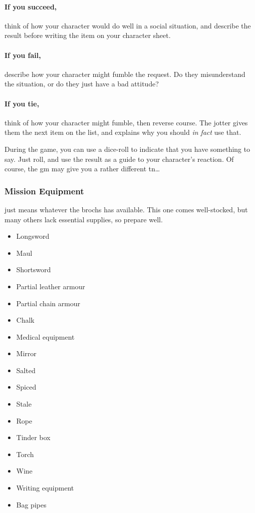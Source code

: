 \begin{multicols}{2}
\paragraph{If you succeed,}
think of how your character would do well in a social situation, and describe the result before writing the item on your character sheet.

\paragraph{If you fail,}
describe how your character might fumble the request.
Do they misunderstand the situation, or do they just have a bad attitude?

\paragraph{If you tie,}
think of how your character might fumble, then reverse course.
The jotter gives them the next item on the list, and explains why you should \emph{in fact} use that.

During the game, you can use a dice-roll to indicate that you have something to say.
Just roll, and use the result as a guide to your character's reaction.%
Of course, the \gls{gm} may give you a rather different \gls{tn}\ldots

\subsubsection{Mission Equipment}
\label{start_equipment}
just means whatever the \glspl{broch} has available.
This one comes well-stocked, but many others lack essential supplies, so prepare well.

\begin{multicols}{2}
\begin{itemize}
\raggedright
  \item
  Longsword
  \item
  Maul
  \item
  Shortsword
  \item
  Partial leather armour
  \item
  Partial chain armour
  \item
  Chalk
  \item
  Medical equipment
  \item
  Mirror
  \item
  Salted \rations
  \item
  Spiced \rations
  \item
  Stale \rations
  \item
  Rope
  \item
  Tinder box
  \item
  Torch
  \item
  Wine
  \item
  Writing equipment
  \item
  Bag pipes
\end{itemize}


\end{multicols}
\end{multicols}
